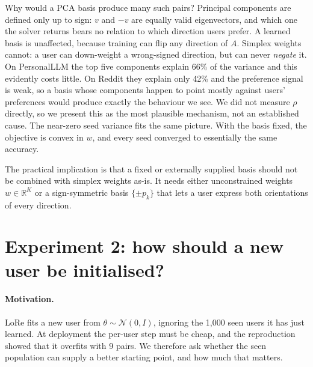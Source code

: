 \documentclass[11pt,a4paper]{article}
\newcommand{\R}{\mathbb{R}}
\begin{document}
Why would a PCA basis produce many such pairs? Principal components are defined only up to sign: $v$
and $-v$ are equally valid eigenvectors, and which one the solver returns bears no relation to which
direction users prefer. A learned basis is unaffected, because training can flip any direction of $A$.
Simplex weights cannot: a user can down-weight a wrong-signed direction, but can never \emph{negate}
it. On PersonalLLM the top five components explain 66\% of the variance and this evidently costs
little. On Reddit they explain only 42\% and the preference signal is weak, so a basis whose
components happen to point mostly against users' preferences would produce exactly the behaviour we
see. We did not measure $\rho$ directly, so we present this as the most plausible mechanism, not an
established cause. The near-zero seed variance fits the same picture. With the basis fixed, the
objective is convex in $w$, and every seed converged to essentially the same accuracy.

The practical implication is that a fixed or externally supplied basis should not be combined with
simplex weights as-is. It needs either unconstrained weights $w\in\R^K$ or a sign-symmetric basis
$\{\pm p_k\}$ that lets a user express both orientations of every direction.

\section{Experiment 2: how should a new user be initialised?}
\label{sec:init}

\paragraph{Motivation.} LoRe fits a new user from $\theta\sim\mathcal{N}(0,I)$, ignoring the 1{,}000 seen
users it has just learned. At deployment the per-user step must be cheap, and the reproduction showed
that it overfits with 9 pairs. We therefore ask whether the seen population can supply a better starting
point, and how much that matters.
\end{document}

